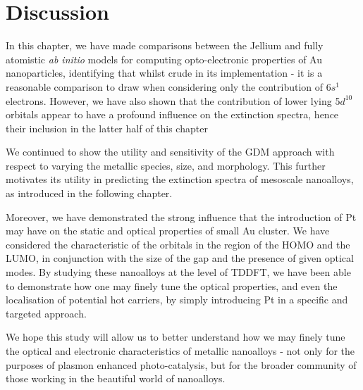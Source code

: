 \section{Discussion}

In this chapter, we have made comparisons between the Jellium and fully atomistic \textit{ab initio} models for computing opto-electronic properties of Au nanoparticles, identifying that whilst crude in its implementation - it is a reasonable comparison to draw when considering only the contribution of 6$s^{1}$ electrons. However, we have also shown that the contribution of lower lying 5$d^{10}$ orbitals appear to have a profound influence on the extinction spectra, hence their inclusion in the latter half of this chapter

We continued to show the utility and sensitivity of the GDM approach with respect to varying the metallic species, size, and morphology. This further motivates its utility in predicting the extinction spectra of mesoscale nanoalloys, as introduced in the following chapter.

Moreover, we have demonstrated the strong influence that the introduction of Pt may have on the static and optical properties of small Au cluster. We have considered the characteristic of the orbitals in the region of the HOMO and the LUMO, in conjunction with the size of the gap and the presence of given optical modes. By studying these nanoalloys at the level of TDDFT, we have been able to demonstrate how one may finely tune the optical properties, and even the localisation of potential hot carriers, by simply introducing Pt in a specific and targeted approach.

We hope this study will allow us to better understand how we may finely tune the optical and electronic characteristics of metallic nanoalloys - not only for the purposes of plasmon enhanced photo-catalysis, but for the broader community of those working in the beautiful world of nanoalloys.

